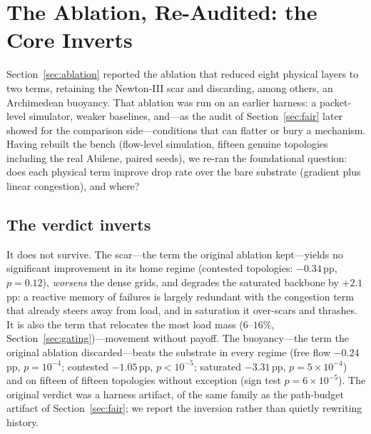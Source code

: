 \section{The Ablation, Re-Audited: the Core Inverts}
\label{sec:redux}

Section~\ref{sec:ablation} reported the ablation that reduced eight physical
layers to two terms, retaining the Newton-III scar and discarding, among
others, an Archimedean buoyancy. That ablation was run on an earlier harness:
a packet-level simulator, weaker baselines, and---as the audit of
Section~\ref{sec:fair} later showed for the comparison side---conditions that
can flatter or bury a mechanism. Having rebuilt the bench (flow-level
simulation, fifteen genuine topologies including the real Abilene, paired
seeds), we re-ran the foundational question: does each physical term improve
drop rate over the bare substrate (gradient plus linear congestion), and
where?

\subsection{The verdict inverts}

It does not survive. The scar---the term the original ablation kept---yields
no significant improvement in its home regime (contested topologies:
$-0.34$\,pp, $p=0.12$), \emph{worsens} the dense grids, and degrades the
saturated backbone by $+2.1$\,pp: a reactive memory of failures is largely
redundant with the congestion term that already steers away from load, and in
saturation it over-scars and thrashes. It is also the term that relocates the
most load mass ($6$--$16\%$, Section~\ref{sec:gating})---movement without
payoff. The buoyancy---the term the original ablation discarded---beats the
substrate in every regime (free flow $-0.24$\,pp, $p=10^{-4}$; contested
$-1.05$\,pp, $p<10^{-5}$; saturated $-3.31$\,pp, $p=5\times10^{-4}$) and on
fifteen of fifteen topologies without exception (sign test
$p=6\times10^{-5}$). The original verdict was a harness artifact, of the same
family as the path-budget artifact of Section~\ref{sec:fair}; we report the
inversion rather than quietly rewriting history.

